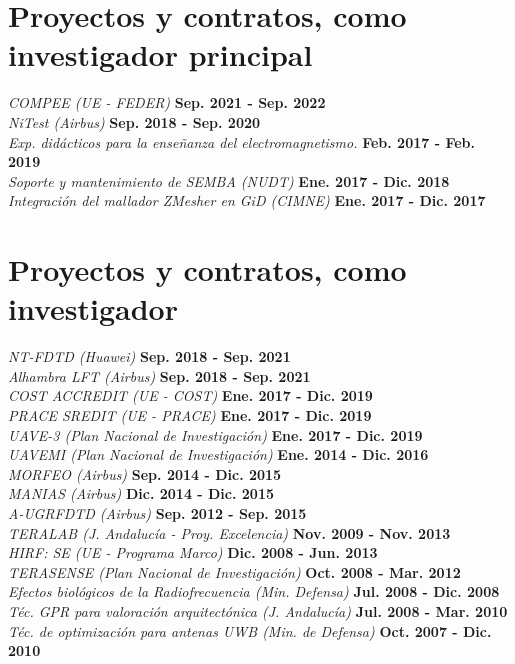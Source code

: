 \documentclass[margin,line]{res}
\begin{document}
\begin{resume}
\begin{minipage}{\textwidth}
	\section{\sc Proyectos y contratos, como investigador principal}
   {\em COMPEE (UE - FEDER)} \hfill {\bf Sep. 2021 - Sep. 2022}\\
   {\em NiTest (Airbus)} \hfill {\bf Sep. 2018 - Sep. 2020}\\
   {\em Exp. didácticos para la enseñanza del electromagnetismo.} \hfill {\bf Feb. 2017 - Feb. 2019}\\
   {\em Soporte y mantenimiento de SEMBA (NUDT)} \hfill {\bf Ene. 2017 - Dic. 2018}\\
   {\em Integración del mallador ZMesher en GiD (CIMNE)} \hfill {\bf Ene. 2017 - Dic. 2017}\\  
\end{minipage}

\begin{minipage}{\textwidth}
	\section{\sc Proyectos y contratos, como investigador}
  {\em NT-FDTD (Huawei)} \hfill {\bf Sep. 2018 - Sep. 2021}\\
	{\em Alhambra LFT (Airbus)} \hfill {\bf Sep. 2018 - Sep. 2021}\\
	{\em COST ACCREDIT (UE - COST)} \hfill {\bf Ene. 2017 - Dic. 2019}\\
  {\em PRACE SREDIT (UE - PRACE)} \hfill {\bf Ene. 2017 - Dic. 2019}\\
  {\em UAVE-3 (Plan Nacional de Investigación)} \hfill {\bf Ene. 2017 - Dic. 2019}\\
  {\em UAVEMI  (Plan Nacional de Investigación)} \hfill {\bf Ene. 2014 - Dic. 2016}\\
  {\em MORFEO (Airbus)} \hfill {\bf Sep. 2014 - Dic. 2015}\\
  {\em MANIAS (Airbus)} \hfill {\bf Dic. 2014 - Dic. 2015}\\
  {\em A-UGRFDTD (Airbus)} \hfill {\bf Sep. 2012 - Sep. 2015}\\
  {\em TERALAB (J. Andalucía - Proy. Excelencia)} \hfill {\bf Nov. 2009 - Nov. 2013}\\
  {\em HIRF: SE (UE - Programa Marco)} \hfill {\bf Dic. 2008 - Jun. 2013}\\  
  {\em TERASENSE (Plan Nacional de Investigación)} \hfill {\bf Oct. 2008 - Mar. 2012}\\
  {\em Efectos biológicos de la Radiofrecuencia (Min. Defensa)} \hfill {\bf Jul. 2008 - Dic. 2008}\\
  {\em Téc. GPR para valoración arquitectónica (J. Andalucía)} \hfill {\bf Jul. 2008 - Mar. 2010}\\
  {\em Téc. de optimización para antenas UWB (Min. de Defensa)} \hfill {\bf Oct. 2007 - Dic. 2010}\\
\end{minipage}

\end{resume}
\end{document}

